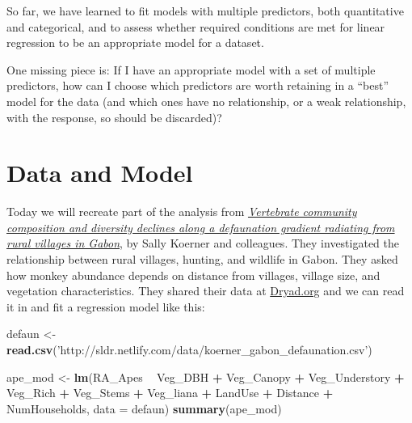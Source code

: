 \documentclass[]{book}
\newenvironment{Shaded}{\begin{snugshade}}{\end{snugshade}}
\newcommand{\DataTypeTok}[1]{\textcolor[rgb]{0.13,0.29,0.53}{#1}}
\newcommand{\KeywordTok}[1]{\textcolor[rgb]{0.13,0.29,0.53}{\textbf{#1}}}
\newcommand{\NormalTok}[1]{#1}
\newcommand{\OperatorTok}[1]{\textcolor[rgb]{0.81,0.36,0.00}{\textbf{#1}}}
\newcommand{\StringTok}[1]{\textcolor[rgb]{0.31,0.60,0.02}{#1}}
\begin{document}
So far, we have learned to fit models with multiple predictors, both quantitative and categorical, and to assess whether required conditions are met for linear regression to be an appropriate model for a dataset.

One missing piece is: If I have an appropriate model with a set of multiple predictors, how can I choose which predictors are worth retaining in a ``best'' model for the data (and which ones have no relationship, or a weak relationship, with the response, so should be discarded)?

\hypertarget{data-and-model}{%
\section{Data and Model}\label{data-and-model}}

Today we will recreate part of the analysis from \href{https://doi.org/10.1111/1365-2664.12798}{\emph{Vertebrate community composition and diversity declines along a defaunation gradient radiating from rural villages in Gabon}}, by Sally Koerner and colleagues. They investigated the relationship between rural villages, hunting, and wildlife in Gabon. They asked how monkey abundance depends on distance from villages, village size, and vegetation characteristics. They shared their data at \href{https://datadryad.org/stash/dataset/doi:10.5061/dryad.vs97g}{Dryad.org} and we can read it in and fit a regression model like this:

\begin{Shaded}
\begin{Highlighting}[]
\NormalTok{defaun <-}\StringTok{ }\KeywordTok{read.csv}\NormalTok{(}\StringTok{'http://sldr.netlify.com/data/koerner_gabon_defaunation.csv'}\NormalTok{)}
\end{Highlighting}
\end{Shaded}

\begin{Shaded}
\begin{Highlighting}[]
\NormalTok{ape_mod <-}\StringTok{ }\KeywordTok{lm}\NormalTok{(RA_Apes }\OperatorTok{~}\StringTok{ }\NormalTok{Veg_DBH }\OperatorTok{+}\StringTok{ }\NormalTok{Veg_Canopy }\OperatorTok{+}\StringTok{ }\NormalTok{Veg_Understory }\OperatorTok{+}
\StringTok{                   }\NormalTok{Veg_Rich }\OperatorTok{+}\StringTok{ }\NormalTok{Veg_Stems }\OperatorTok{+}\StringTok{ }\NormalTok{Veg_liana }\OperatorTok{+}
\StringTok{                   }\NormalTok{LandUse }\OperatorTok{+}\StringTok{ }\NormalTok{Distance }\OperatorTok{+}\StringTok{ }\NormalTok{NumHouseholds, }\DataTypeTok{data =}\NormalTok{ defaun)}
\KeywordTok{summary}\NormalTok{(ape_mod)}
\end{Highlighting}
\end{Shaded}
\end{document}
